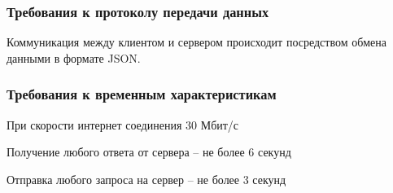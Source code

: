 \subsubsection{Требования к протоколу передачи данных}
Коммуникация между клиентом и сервером происходит посредством обмена данными в формате JSON.

\subsubsection{Требования к временным характеристикам}
При скорости интернет соединения 30 Мбит/с
\begin{my_enumerate}
\item Получение любого ответа от сервера -- не более 6 секунд
\item Отправка любого запроса на сервер -- не более 3 секунд
\end{my_enumerate}

